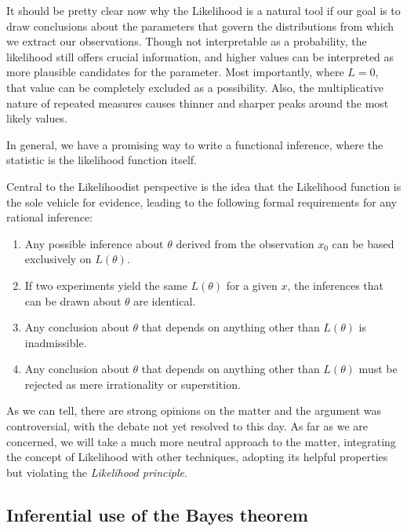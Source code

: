 It should be pretty clear now why the Likelihood is a natural tool if our goal is to draw conclusions about the parameters that govern the distributions from which we extract our observations. Though not interpretable as a probability, the likelihood still offers crucial information, and higher values can be interpreted as more plausible candidates for the parameter. Most importantly, where $L=0$, that value can be completely excluded as a possibility. Also, the multiplicative nature of repeated measures causes thinner and sharper peaks around the most likely values.

In general, we have a promising way to write a functional inference, where the statistic is the likelihood function itself. 

\begin{definition}
	Central to the Likelihoodist perspective is the idea that the Likelihood function is the sole vehicle for evidence, leading to the following formal requirements for any rational inference: 
	\begin{enumerate}
		\item Any possible inference about $\theta$ derived from the observation $x_0$ can be based exclusively on $L(\theta)$.
		\item If two experiments yield the same $L(\theta)$ for a given $x$, the inferences that can be drawn about $\theta$ are identical.
		\item Any conclusion about $\theta$ that depends on anything other than $L(\theta)$ is inadmissible.
		\item Any conclusion about $\theta$ that depends on anything other than $L(\theta)$ must be rejected as mere irrationality or superstition.
	\end{enumerate}
\end{definition}

As we can tell, there are strong opinions on the matter and the argument was controversial, with the debate not yet resolved to this day. As far as we are concerned, we will take a much more neutral approach to the matter, integrating the concept of Likelihood with other techniques, adopting its helpful properties but violating the \emph{Likelihood principle}.

\subsection{Inferential use of the Bayes theorem}
\label{subsec:Inf_Bayes}

